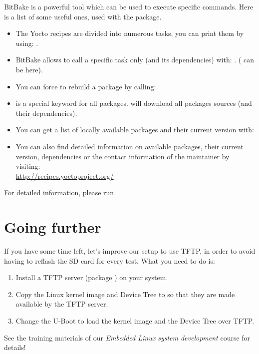 BitBake is a powerful tool which can be used to execute specific commands. Here
is a list of some useful ones, used with the  package.

\begin{itemize}
  \item The Yocto recipes are divided into numerous tasks, you can print them
        by using: .
  \item BitBake allows to call a specific task only (and its dependencies)
        with: . ( can be
         here).
  \item You can force to rebuild a package by calling: 
  \item {} is a special keyword for all packages.  will download all packages sources (and their
        dependencies).
  \item You can get a list of locally available packages and their current
        version with: \\
  \item You can also find detailed information on available packages, their
        current version, dependencies or the contact information of the
        maintainer by visiting: \\
        \url{http://recipes.yoctoproject.org/}
\end{itemize}

For detailed information, please run 

\section{Going further}

If you have some time left, let's improve our setup to use TFTP, in
order to avoid having to reflash the SD card for every test. What you
need to do is:

\begin{enumerate}

\item Install a TFTP server (package ) on your system. 

\item Copy the Linux kernel image and Device Tree to
   so that they are made available by the TFTP
  server.

\item Change the U-Boot  to load the kernel image and
  the Device Tree over TFTP.

\end{enumerate}

See the training materials of our {\em Embedded Linux system
  development} course for details!
